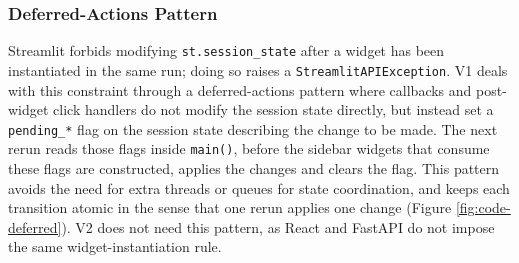 \subsubsection{Deferred-Actions Pattern}


Streamlit forbids modifying \texttt{st.session\_state} after a widget has been instantiated in the same run; doing so raises a \texttt{StreamlitAPIException}. 
V1 deals with this constraint through a deferred-actions pattern where callbacks and post-widget click handlers do not modify the session state directly, but instead set a \texttt{pending\_*} flag on the session state describing the change to be made.
The next rerun reads those flags inside \texttt{main()}, before the sidebar widgets that consume these flags are constructed, applies the changes and clears the flag.
This pattern avoids the need for extra threads or queues for state coordination, and keeps each transition atomic in the sense that one rerun applies one change (Figure \ref{fig:code-deferred}).
V2 does not need this pattern, as React and FastAPI do not impose the same widget-instantiation rule.


